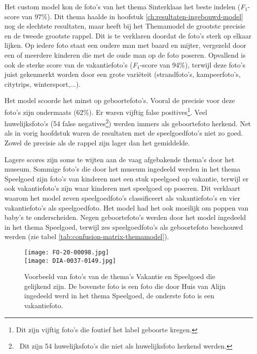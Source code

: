 Het custom model kon de foto's van het thema Sinterklaas het beste indelen (\textit{F$_{1}$}-score van 97\%). Dit thema haalde in hoofstuk \ref{ch:resultaten-ingebouwd-model} nog de slechtste resultaten, maar heeft bij het Themamodel de grootste precisie en de tweede grootste rappel. Dit is te verklaren doordat de foto’s sterk op elkaar lijken. Op iedere foto staat een oudere man met baard en mijter, vergezeld door een of meerdere kinderen die met de oude man op de foto poseren. Opvallend is ook de sterke score van de vakantiefoto’s (\textit{F$_{1}$}-score van 94\%), terwijl deze foto’s juist gekenmerkt worden door een grote variëteit (strandfoto’s, kampeerfoto’s, citytrips, wintersport,...).

Het model scoorde het minst op geboortefoto’s. Vooral de precisie voor deze foto’s zijn ondermaats (62\%). Er waren vijftig false positives\footnote{Dit zijn vijftig foto's die foutief het label geboorte kregen.}. Veel huwelijksfoto’s (54 false negatives\footnote{~Dit zijn 54 huwelijksfoto's die niet als huwelijksfoto herkend werden.}) werden immers als geboortefoto herkend.  Net als in vorig hoofdstuk waren de resultaten met de speelgoedfoto’s niet zo goed. Zowel de precisie als de rappel zijn lager dan het gemiddelde.

Lagere scores zijn soms te wijten aan de vaag afgebakende thema’s door het museum. Sommige foto’s die door het museum ingedeeld werden in het thema Speelgoed zijn foto’s van kinderen met een stuk speelgoed op vakantie, terwijl er ook vakantiefoto’s zijn waar kinderen met speelgoed op poseren. Dit verklaart waarom het model zeven speelgoedfoto’s classificeert als vakantiefoto’s en vier vakantiefoto’s als speelgoedfoto. Het model had het ook moeilijk om poppen van baby’s te onderscheiden. Negen geboortefoto’s werden door het model ingedeeld in het thema Speelgoed, terwijl zes speelgoedfoto’s als geboortefoto beschouwd werden (zie tabel \ref{tab:confusion-matrix-themamodel}).

\begin{figure}
	\centering
	\texttt{[image: FO-20-00098.jpg]}\hfill
	\\[\smallskipamount]
	\texttt{[image: DIA-0037-0149.jpg]}\hfill
	\caption[Voorbeeld van foto's van de thema's Vakantie en Speelgoed die gelijkend zijn]{Voorbeeld van foto's van de thema's Vakantie en Speelgoed die gelijkend zijn. De bovenste foto is een foto die door Huis van Alijn ingedeeld werd in het thema Speelgoed, de onderste foto is een vakantiefoto.}
\end{figure}

